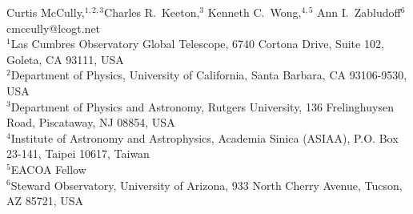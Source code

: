  {Curtis McCully,$^{1, 2, 3}$\footnotemark[1]
  Charles R.\ Keeton,$^3$
  Kenneth C.\ Wong,$^{4, 5}$
  Ann I.\ Zabludoff$^6$\\
  \footnotemark[1]cmccully@lcogt.net\\
  $^1$Las Cumbres Observatory Global Telescope, 6740 Cortona Drive, Suite 102, Goleta, CA 93111, USA\\
  $^2$Department of Physics, University of California, Santa Barbara,
CA 93106-9530, USA\\
  $^3$Department of Physics and Astronomy, Rutgers University, 136 Frelinghuysen Road, Piscataway, NJ 08854, USA\\
  $^4$Institute of Astronomy and Astrophysics, Academia Sinica (ASIAA), P.O. Box 23-141, Taipei 10617, Taiwan\\
  $^5$EACOA Fellow\\
    $^6$Steward Observatory, University of Arizona, 933 North Cherry Avenue, Tucson, AZ 85721, USA\\}
  